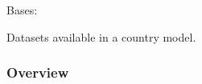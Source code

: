 \documentclass[letterpaper,10pt,english]{sphinxmanual}
\begin{document}

\begin{fulllineitems}
\label{\detokenize{autoapi/euromod/core/index:euromod.core.Dataset}}
\pysigstartsignatures
{}
\pysigstopsignatures
\sphinxAtStartPar
Bases: 

\sphinxAtStartPar
Datasets available in a country model.
\subsubsection*{Overview}



\end{fulllineitems}
\end{document}
